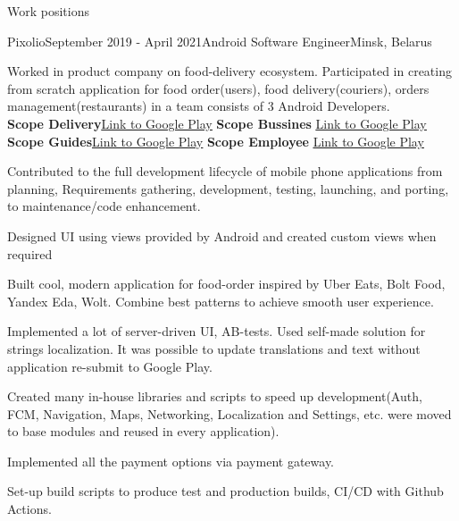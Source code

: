 \documentclass{resume} %
\begin{document}
\begin{rSection}{Work positions}
\begin{rSubsection}{Pixolio}{September 2019 - April 2021}{Android Software Engineer}{Minsk, Belarus}
\item[] Worked in product company on food-delivery ecosystem. Participated in creating from scratch application for food order(users), food delivery(couriers), orders management(restaurants) in a team consists of 3 Android Developers.\smallskip \\
\textbf{Scope Delivery}\hspace{15mm}\underline{\href{https://play.google.com/store/apps/details?id=city.scope.delivery}{Link to Google Play}}\hspace{15mm}
\textbf{Scope Bussines}  \hfill\underline{\href{https://play.google.com/store/apps/details?id=city.scope.biz}{Link to Google Play}}\\
\textbf{Scope Guides}\hspace{18mm}\underline{\href{https://play.google.com/store/apps/details?id=city.scope}{Link to Google Play}}\hspace{15mm}
\textbf{Scope Employee}  \hfill\underline{\href{https://play.google.com/store/apps/details?id=city.scope.employee}{Link to Google Play}}
\item Contributed to the full development lifecycle of mobile phone applications from planning,
Requirements gathering, development, testing, launching, and porting, to maintenance/code
enhancement.
\item Designed UI using views provided by Android and created custom views when required
\item Built cool, modern application for food-order inspired by Uber Eats, Bolt Food, Yandex Eda, Wolt. Combine best patterns to achieve smooth user experience. 
\item Implemented a lot of server-driven UI, AB-tests. Used self-made solution for strings localization. It was possible to update translations and text without application re-submit to Google Play.
\item Created many in-house libraries and scripts to speed up development(Auth, FCM, Navigation, Maps, Networking, Localization and Settings, etc. were moved to base modules and reused in every application).
\item Implemented all the payment options via payment gateway.
\item Set-up build scripts to produce test and production builds, CI/CD with Github Actions.


\end{rSubsection}



\end{rSection}
\end{document}
